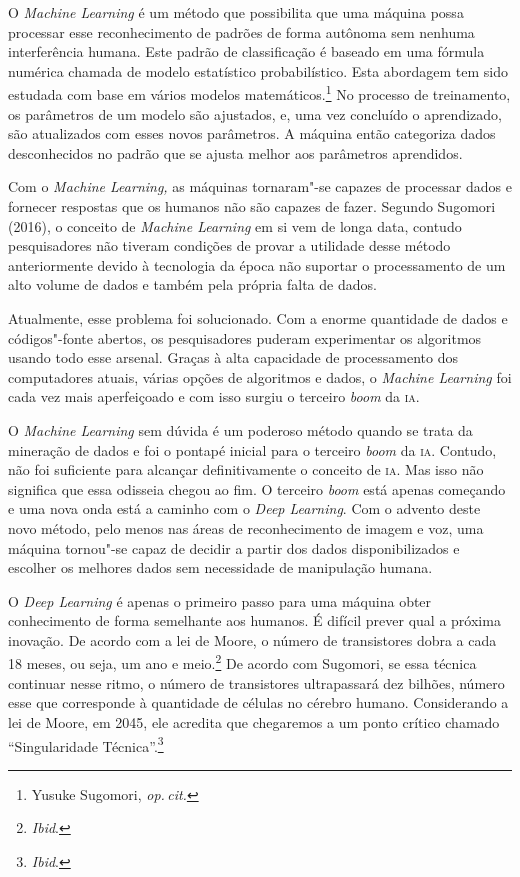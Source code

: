 O \emph{Machine Learning} é um método que possibilita que uma máquina
possa processar esse reconhecimento de padrões de forma autônoma sem
nenhuma interferência humana. Este padrão de classificação é baseado em
uma fórmula numérica chamada de modelo estatístico probabilístico. Esta
abordagem tem sido estudada com base em vários modelos matemáticos.\footnote{Yusuke Sugomori, \textit{op.\,cit.}} 
No processo de treinamento, os parâmetros de um modelo
são ajustados, e, uma vez concluído o aprendizado, são atualizados com
esses novos parâmetros. A máquina então categoriza dados desconhecidos
no padrão que se ajusta melhor aos parâmetros aprendidos.

Com o \emph{Machine Learning,} as máquinas tornaram"-se capazes de
processar dados e fornecer respostas que os humanos não são capazes de
fazer. Segundo Sugomori (2016), o conceito de \emph{Machine Learning} em
si vem de longa data, contudo pesquisadores não tiveram condições de
provar a utilidade desse método anteriormente devido à tecnologia da
época não suportar o processamento de um alto volume de dados e também
pela própria falta de dados.

Atualmente, esse problema foi solucionado. Com a enorme quantidade de
dados e códigos"-fonte abertos, os pesquisadores puderam experimentar os
algoritmos usando todo esse arsenal. Graças à alta capacidade de
processamento dos computadores atuais, várias opções de algoritmos e
dados, o \emph{Machine Learning} foi cada vez mais aperfeiçoado e com
isso surgiu o terceiro \emph{boom} da \textsc{ia}.

O \emph{Machine Learning} sem dúvida é um poderoso método quando se
trata da mineração de dados e foi o pontapé inicial para o terceiro
\emph{boom} da \textsc{ia}. Contudo, não foi suficiente para alcançar
definitivamente o conceito de \textsc{ia}. Mas isso não significa que essa
odisseia chegou ao fim. O terceiro \emph{boom} está apenas começando e uma nova
onda está a caminho com o \emph{Deep Learning}. Com o advento deste novo
método, pelo menos nas áreas de reconhecimento de imagem e voz, uma
máquina tornou"-se capaz de decidir a partir dos dados disponibilizados e
escolher os melhores dados sem necessidade de manipulação humana.

O \emph{Deep Learning} é apenas o primeiro passo para uma máquina obter
conhecimento de forma semelhante aos humanos. É difícil prever qual a
próxima inovação. De acordo com a lei de Moore, o número de transistores
dobra a cada 18 meses, ou seja, um ano e meio.\footnote{\textit{Ibid}.} De
acordo com Sugomori, se essa técnica continuar nesse ritmo, o número de
transistores ultrapassará dez bilhões, número esse que corresponde à
quantidade de células no cérebro humano. Considerando a lei de Moore, em
2045, ele acredita que chegaremos a um ponto crítico chamado
``Singularidade Técnica''.\footnote{\textit{Ibid}.}

